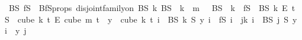 \begin{isabellebody}
\ BS\ fS\ \ BfS{\isacharunderscore}{\kern0pt}props{\isacharcolon}{\kern0pt}\ {\isachardoublequoteopen}disjoint{\isacharunderscore}{\kern0pt}family{\isacharunderscore}{\kern0pt}on\ BS\ {\isacharbraceleft}{\kern0pt}{\isachardot}{\kern0pt}{\isachardot}{\kern0pt}k{\isacharbraceright}{\kern0pt}{\isachardoublequoteclose}\ {\isachardoublequoteopen}{\isasymUnion}{\isacharparenleft}{\kern0pt}BS\ {\isacharbackquote}{\kern0pt}\ {\isacharbraceleft}{\kern0pt}{\isachardot}{\kern0pt}{\isachardot}{\kern0pt}k{\isacharbraceright}{\kern0pt}{\isacharparenright}{\kern0pt}\ {\isacharequal}{\kern0pt}\ {\isacharbraceleft}{\kern0pt}{\isachardot}{\kern0pt}{\isachardot}{\kern0pt}{\isacharless}{\kern0pt}m{\isacharbraceright}{\kern0pt}{\isachardoublequoteclose}\ {\isachardoublequoteopen}{\isacharparenleft}{\kern0pt}{\isacharbraceleft}{\kern0pt}{\isacharbraceright}{\kern0pt}\ {\isasymnotin}\ BS\ {\isacharbackquote}{\kern0pt}\ {\isacharbraceleft}{\kern0pt}{\isachardot}{\kern0pt}{\isachardot}{\kern0pt}{\isacharless}{\kern0pt}k{\isacharbraceright}{\kern0pt}{\isacharparenright}{\kern0pt}{\isachardoublequoteclose}\ {\isachardoublequoteopen}\ fS\ {\isasymin}\ {\isacharparenleft}{\kern0pt}BS\ k{\isacharparenright}{\kern0pt}\ {\isasymrightarrow}\isactrlsub E\ {\isacharbraceleft}{\kern0pt}{\isachardot}{\kern0pt}{\isachardot}{\kern0pt}{\isacharless}{\kern0pt}t{\isacharplus}{\kern0pt}{}{\isacharbraceright}{\kern0pt}{\isachardoublequoteclose}\ {\isachardoublequoteopen}S\ {\isasymin}\ {\isacharparenleft}{\kern0pt}cube\ k\ {\isacharparenleft}{\kern0pt}t{\isacharplus}{\kern0pt}{}{\isacharparenright}{\kern0pt}{\isacharparenright}{\kern0pt}\ {\isasymrightarrow}\isactrlsub E\ {\isacharparenleft}{\kern0pt}cube\ m\ {\isacharparenleft}{\kern0pt}t{\isacharplus}{\kern0pt}{}{\isacharparenright}{\kern0pt}{\isacharparenright}{\kern0pt}\ {\isachardoublequoteclose}\ {\isachardoublequoteopen}{\isacharparenleft}{\kern0pt}{\isasymforall}y\ {\isasymin}\ cube\ k\ {\isacharparenleft}{\kern0pt}t{\isacharplus}{\kern0pt}{}{\isacharparenright}{\kern0pt}{\isachardot}{\kern0pt}\ {\isacharparenleft}{\kern0pt}{\isasymforall}i\ {\isasymin}\ BS\ k{\isachardot}{\kern0pt}\ S\ y\ i\ {\isacharequal}{\kern0pt}\ fS\ i{\isacharparenright}{\kern0pt}\ {\isasymand}\ {\isacharparenleft}{\kern0pt}{\isasymforall}j{\isacharless}{\kern0pt}k{\isachardot}{\kern0pt}\ {\isasymforall}i\ {\isasymin}\ BS\ j{\isachardot}{\kern0pt}\ {\isacharparenleft}{\kern0pt}S\ y{\isacharparenright}{\kern0pt}\ i\ {\isacharequal}{\kern0pt}\ y\ j{\isacharparenright}{\kern0pt}{\isacharparenright}{\kern0pt}{\isachardoublequoteclose}\ \isamarkupfalse%

\end{isabellebody}
